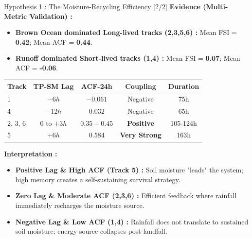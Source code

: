 \documentclass[8pt, aspectratio=169]{beamer}
\begin{document}
\begin{frame}{Hypothesis 1 : The Moisture-Recycling Efficiency [2/2]}
    \footnotesize
    \textbf{Evidence (Multi-Metric Validation) :}
    \begin{itemize}
        \item \textbf{Brown Ocean dominated Long-lived tracks (2,3,5,6) :} Mean FSI = \textbf{0.42}; Mean ACF = \textbf{0.44}.
        \item \textbf{Runoff dominated Short-lived tracks (1,4) :} Mean FSI = \textbf{0.07}; Mean ACF = \textbf{-0.06}.
    \end{itemize}

    \vspace{0.1cm}
    \begin{center}
    \begin{tabular}{lcccc}
        \toprule
        \textbf{Track} & \textbf{TP-SM Lag} & \textbf{ACF-24h} & \textbf{Coupling} & \textbf{Duration} \\
        \midrule
        1 & $-6h$ & $-0.061$ & Negative & 75h \\
        4 & $-12h$ & $0.032$ & Negative & 65h \\
        2, 3, 6 & $0$ to $+3h$ & $0.35-0.45$ & \textbf{Positive} & 105-124h \\
        5 & $+6h$ & $0.584$ & \textbf{Very Strong} & 163h \\
        \bottomrule
    \end{tabular}
    \end{center}

    \vspace{0.1cm}
    \footnotesize
    \textbf{Interpretation :}
    \begin{itemize}
        \item \textbf{Positive Lag \& High ACF (Track 5) :} Soil moisture "leads" the system; high memory creates a self-sustaining survival strategy.
        \item \textbf{Zero Lag \& Moderate ACF (2,3,6) :} Efficient feedback where rainfall immediately recharges the moisture source.  \cite{osuri2020}
        \item \textbf{Negative Lag \& Low ACF (1,4) :} Rainfall does not translate to sustained soil moisture; energy source collapses post-landfall.
    \end{itemize}
\end{frame}
\end{document}
